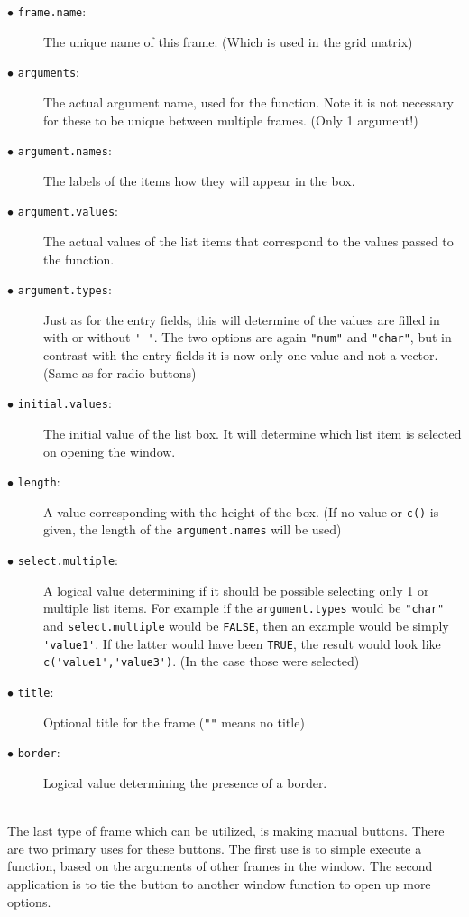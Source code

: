 \documentclass[a4paper]{article}\usepackage[]{graphicx}\usepackage[]{color}
\begin{document}
\begin{description}
  \item[$\bullet$ \texttt{frame.name}:] The unique name of this frame. (Which is used in the grid matrix)
  \item[$\bullet$ \texttt{arguments}:] The actual argument name, used for the
  function. Note it is not necessary for these to be unique between multiple
  frames. (Only 1 argument!)
  \item[$\bullet$ \texttt{argument.names}:] The labels of the items how they
  will appear in the box.
  \item[$\bullet$ \texttt{argument.values}:] The actual values of the list items 
  that correspond to the values passed to the function. 
  \item[$\bullet$ \texttt{argument.types}:] Just as for the entry fields, this
  will determine of the values are filled in with or without \verb|' '|. The two options
  are again \verb|"num"| and \verb|"char"|, but in contrast with the entry
  fields it is now only one value and not a vector. (Same as for radio buttons)
  \item[$\bullet$ \texttt{initial.values}:] The initial value of the list box.
  It will determine which list item is selected on opening the window.
  \item[$\bullet$ \texttt{length}:] A value corresponding with the height of the
  box. (If no value or \verb|c()| is given, the length of the
  \verb|argument.names| will be used)
  \item[$\bullet$ \texttt{select.multiple}:] A logical value determining if it
  should be possible selecting only 1 or multiple list items. For example if the
  \verb|argument.types| would be \verb|"char"| and \verb|select.multiple| would
  be \verb|FALSE|, then an example would be simply \verb|'value1'|. If the
  latter would have been \verb|TRUE|, the result would look like
  \verb|c('value1','value3')|. (In the case those were selected)
  \item[$\bullet$ \texttt{title}:] Optional title for the frame (\verb|""| means
  no title)
  \item[$\bullet$ \texttt{border}:] Logical value determining the presence of a
  border.   
\end{description}


\\
The last type of frame which can be utilized, is making manual buttons. There
are two primary uses for these buttons. The first use is to simple execute a
function, based on the arguments of other frames in the window. The second
application is to tie the button to another window function to open up more options.
\end{document}
